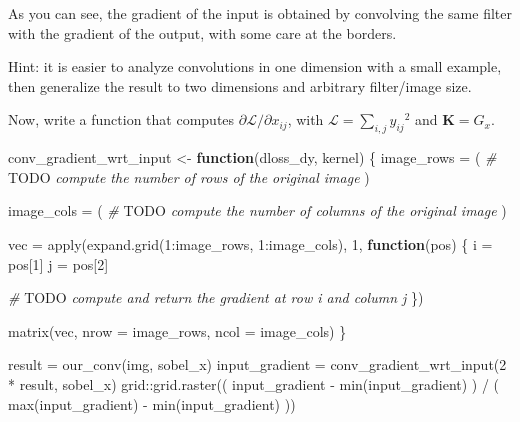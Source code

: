 \documentclass[
  a4paper,
]{article}
\newenvironment{Shaded}{\begin{snugshade}}{\end{snugshade}}
\newcommand{\AlertTok}[1]{\textcolor[rgb]{0.94,0.16,0.16}{#1}}
\newcommand{\AttributeTok}[1]{\textcolor[rgb]{0.77,0.63,0.00}{#1}}
\newcommand{\CommentTok}[1]{\textcolor[rgb]{0.56,0.35,0.01}{\textit{#1}}}
\newcommand{\ControlFlowTok}[1]{\textcolor[rgb]{0.13,0.29,0.53}{\textbf{#1}}}
\newcommand{\DecValTok}[1]{\textcolor[rgb]{0.00,0.00,0.81}{#1}}
\newcommand{\FunctionTok}[1]{\textcolor[rgb]{0.00,0.00,0.00}{#1}}
\newcommand{\NormalTok}[1]{#1}
\newcommand{\OtherTok}[1]{\textcolor[rgb]{0.56,0.35,0.01}{#1}}
\newcommand{\SpecialCharTok}[1]{\textcolor[rgb]{0.00,0.00,0.00}{#1}}
\begin{document}
As you can see, the gradient of the input is obtained by convolving the
same filter with the gradient of the output, with some care at the
borders.

Hint: it is easier to analyze convolutions in one dimension with a small
example, then generalize the result to two dimensions and arbitrary
filter/image size.

Now, write a function that computes
\(\partial \mathcal{L}/\partial x_{ij}\), with
\(\mathcal{L}=\sum_{i,j}{y_{ij}}^2\) and \(\textbf{K}=G_x\).

\begin{Shaded}
\begin{Highlighting}[]
\NormalTok{conv\_gradient\_wrt\_input }\OtherTok{\textless{}{-}} \ControlFlowTok{function}\NormalTok{(dloss\_dy, kernel) \{}
\NormalTok{  image\_rows }\OtherTok{=}\NormalTok{ (}
    \CommentTok{\# }\AlertTok{TODO}\CommentTok{ compute the number of rows of the original image}
\NormalTok{  )}
  
\NormalTok{  image\_cols }\OtherTok{=}\NormalTok{ (}
    \CommentTok{\# }\AlertTok{TODO}\CommentTok{ compute the number of columns of the original image}
\NormalTok{  )}

\NormalTok{  vec }\OtherTok{=} \FunctionTok{apply}\NormalTok{(}\FunctionTok{expand.grid}\NormalTok{(}\DecValTok{1}\SpecialCharTok{:}\NormalTok{image\_rows, }\DecValTok{1}\SpecialCharTok{:}\NormalTok{image\_cols), }\DecValTok{1}\NormalTok{, }\ControlFlowTok{function}\NormalTok{(pos) \{}
\NormalTok{    i }\OtherTok{=}\NormalTok{ pos[}\DecValTok{1}\NormalTok{]}
\NormalTok{    j }\OtherTok{=}\NormalTok{ pos[}\DecValTok{2}\NormalTok{]}

    \CommentTok{\# }\AlertTok{TODO}\CommentTok{ compute and return the gradient at row i and column j}
\NormalTok{  \})}
  
  \FunctionTok{matrix}\NormalTok{(vec, }\AttributeTok{nrow =}\NormalTok{ image\_rows, }\AttributeTok{ncol =}\NormalTok{ image\_cols)}
\NormalTok{\}}


\NormalTok{result }\OtherTok{=} \FunctionTok{our\_conv}\NormalTok{(img, sobel\_x)}
\NormalTok{input\_gradient }\OtherTok{=} \FunctionTok{conv\_gradient\_wrt\_input}\NormalTok{(}\DecValTok{2} \SpecialCharTok{*}\NormalTok{ result, sobel\_x)}
\NormalTok{grid}\SpecialCharTok{::}\FunctionTok{grid.raster}\NormalTok{((}
\NormalTok{  input\_gradient }\SpecialCharTok{{-}} \FunctionTok{min}\NormalTok{(input\_gradient)}
\NormalTok{) }\SpecialCharTok{/}\NormalTok{ (}
  \FunctionTok{max}\NormalTok{(input\_gradient) }\SpecialCharTok{{-}} \FunctionTok{min}\NormalTok{(input\_gradient)}
\NormalTok{))}
\end{Highlighting}
\end{Shaded}
\end{document}
